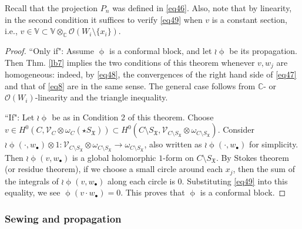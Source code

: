 \documentclass[12pt,a4paper,notitlepage]{article}
\theoremstyle{definition}
\theoremstyle{plain}
\newcommand{\fk}{\mathfrak}
\newcommand{\scr}{\mathscr}
\newcommand{\SX}{{S_{\fk X}}}
\newcommand{\blt}{\bullet}
\newcommand{\Vbb}{\mathbb V}
\newcommand{\Cbb}{\mathbb C}
\numberwithin{equation}{subsection}
\begin{document}
Recall that the projection $P_n$ was defined in \eqref{eq46}. Also, note that by linearity, in the second condition it suffices to verify \eqref{eq49} when $v$ is a constant section, i.e., $v\in\Vbb\subset\Vbb\otimes_\Cbb\scr O(W_i\setminus\{x_i\})$.




\begin{proof}
``Only if": Assume $\upphi$ is a conformal block, and let $\wr\upphi$ be its propagation. Then Thm. \ref{lb7} implies the two conditions of this theorem  whenever $v,w_j$ are homogeneous: indeed, by \eqref{eq48}, the convergences of the right hand side of \eqref{eq47} and that of \eqref{eq8} are in the same sense. The general case follows from $\Cbb$- or $\scr O(W_i)$-linearity and the triangle inequality.

``If": Let $\wr\upphi$ be as in Condition 2 of this theorem. Choose $v\in H^0(C,\scr V_C\otimes\omega_C(\star\SX))\subset H^0(C\setminus\SX,\scr V_{C\setminus\SX}\otimes\omega_{C\setminus\SX})$. Consider $\wr\upphi(\cdot,w_\blt)\otimes 1:\scr V_{C\setminus\SX}\otimes\omega_{C\setminus\SX}\rightarrow \omega_{C\setminus\SX}$, also written as $\wr\upphi(\cdot,w_\blt)$ for simplicity. Then $\wr\upphi(v,w_\blt)$ is a global holomorphic $1$-form on $C\setminus\SX$. By Stokes theorem (or residue theorem), if we choose a small circle around each $x_j$, then the sum of the integrals of $\wr\upphi(v,w_\blt)$ along each circle is $0$. Substituting \eqref{eq49} into this equality, we see $\upphi(v\cdot w_\blt)=0$. This proves that $\upphi$ is a conformal block.
\end{proof}















\subsubsection{Sewing and propagation}\label{lb44}
\end{document}

